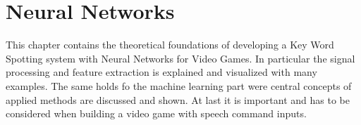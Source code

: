
\chapter{Neural Networks}\label{sec:nn}
This chapter contains the theoretical foundations of developing a Key Word Spotting system with Neural Networks for Video Games. 
In particular the signal processing and feature extraction is explained and visualized with many examples.
The same holds fo the machine learning part were central concepts of applied methods are discussed and shown.
At last it is important and has to be considered when building a video game with speech command inputs.


